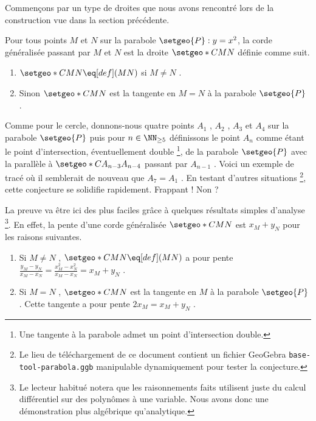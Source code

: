 Commençons par un type de droites que nous avons rencontré lors de la construction vue dans la section précédente. 

\begin{definition}
	Pour tous points $M$  et $N$ sur la parabole $\setgeo{P}: y = x^2$, la corde généralisée passant par $M$ et $N$ est la droite $\setgeo*{C}{MN}$ définie comme suit.
	\begin{enumerate}
		\item $\setgeo*{C}{MN} \eq[def] (MN)$ si $M \neq N$ .

		\item Sinon $\setgeo*{C}{MN}$ est la tangente en $M = N$ à la parabole $\setgeo{P}$ .
	\end{enumerate}
\end{definition}


\medskip

Comme pour le cercle, donnons-nous quatre points $A_1$ , $A_2$ , $A_3$ et $A_4$ sur la parabole $\setgeo{P}$ puis pour $n \in \NN_{\geq 5}$ définissons le point $A_n$ comme étant le point d'intersection, éventuellement double
\footnote{
	Une tangente à la parabole admet un point d'intersection double.
},
de la parabole $\setgeo{P}$ avec la parallèle à $\setgeo*{C}{A_{n-3} A_{n-4}}$ passant par $A_{n-1}$ .
Voici un exemple de tracé où il semblerait de nouveau que $A_7 = A_1$ . En testant d'autres situations
\footnote{
	Le lieu de téléchargement de ce document contient un fichier GeoGebra \texttt{base-tool-parabola.ggb} manipulable dynamiquement pour tester la conjecture.
},
cette conjecture se solidifie rapidement. Frappant ! Non ?
 

\vspace{1em}

\begin{center}
\end{center}

\vspace{1em}

 


La preuve va être ici des plus faciles grâce à quelques résultats simples d'analyse
\footnote{
	Le lecteur habitué notera que les raisonnements faits utilisent juste du calcul différentiel sur des polynômes à une variable. Nous avons donc une démonstration plus algébrique qu'analytique.
}.
En effet, la pente d'une corde généralisée $\setgeo*{C}{MN}$ est $x_M + y_N$ pour les raisons suivantes.
\begin{enumerate}
	\item Si $M \neq N$ , $\setgeo*{C}{MN} \eq[def] (MN)$ a pour pente $\frac{y_M - y_N}{x_M - x_N} = \frac{x_M^2 - x_N^2}{x_M - x_N} = x_M + y_N$ .

	\item Si $M = N$ , $\setgeo*{C}{MN}$ est la tangente en $M$ à la parabole $\setgeo{P}$ . Cette tangente a pour pente $2 x_M = x_M + y_N$ .
\end{enumerate}


